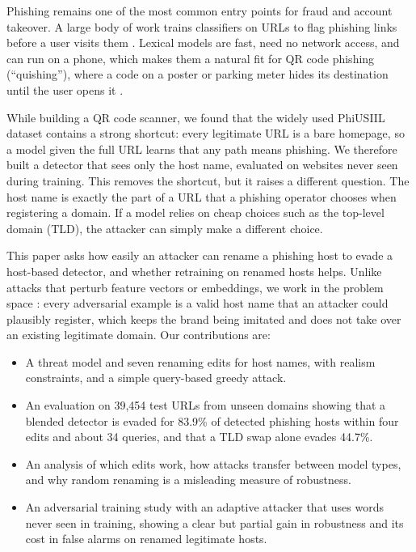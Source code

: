 \documentclass[conference]{IEEEtran}
\begin{document}
Phishing remains one of the most common entry points for fraud and account takeover. A large body of work trains classifiers on URLs to flag phishing links before a user visits them \cite{ma2009beyond, sahoo2017survey, le2018urlnet, bahnsen2017rnn}. Lexical models are fast, need no network access, and can run on a phone, which makes them a natural fit for QR code phishing (``quishing''), where a code on a poster or parking meter hides its destination until the user opens it \cite{trad2025quishing}.

While building a QR code scanner, we found that the widely used PhiUSIIL dataset \cite{prasad2024phiusiil} contains a strong shortcut: every legitimate URL is a bare homepage, so a model given the full URL learns that any path means phishing. We therefore built a detector that sees only the host name, evaluated on websites never seen during training. This removes the shortcut, but it raises a different question. The host name is exactly the part of a URL that a phishing operator chooses when registering a domain. If a model relies on cheap choices such as the top-level domain (TLD), the attacker can simply make a different choice.

This paper asks how easily an attacker can rename a phishing host to evade a host-based detector, and whether retraining on renamed hosts helps. Unlike attacks that perturb feature vectors or embeddings, we work in the problem space \cite{pierazzi2020problemspace}: every adversarial example is a valid host name that an attacker could plausibly register, which keeps the brand being imitated and does not take over an existing legitimate domain. Our contributions are:

\begin{itemize}
\item A threat model and seven renaming edits for host names, with realism constraints, and a simple query-based greedy attack.
\item An evaluation on 39,454 test URLs from unseen domains showing that a blended detector is evaded for 83.9\% of detected phishing hosts within four edits and about 34 queries, and that a TLD swap alone evades 44.7\%.
\item An analysis of which edits work, how attacks transfer between model types, and why random renaming is a misleading measure of robustness.
\item An adversarial training study with an adaptive attacker that uses words never seen in training, showing a clear but partial gain in robustness and its cost in false alarms on renamed legitimate hosts.
\end{itemize}
\end{document}
